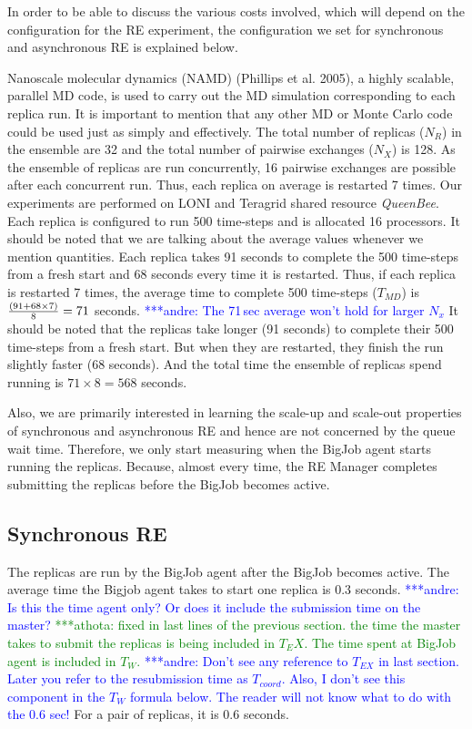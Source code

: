 \documentclass{rspublic}
\newcommand{\alnote}[1]{ {\textcolor{blue} { ***andre: #1 }}}
\newcommand{\athotanote}[1]{ {\textcolor{green} { ***athota: #1 }}}
\newcommand{\alnote}[1]{}
\newcommand{\athotanote}[1]{}
\begin{document}
In order to be able to discuss the various costs involved, 
which will depend on the configuration for the RE experiment, 
the configuration we set for synchronous and asynchronous RE is explained below.

Nanoscale molecular dynamics (NAMD)
(Phillips et al.  2005), a highly scalable, parallel MD code, is used
to carry out the MD simulation corresponding to each replica run. It
is important to mention that any other MD or Monte Carlo code could be
used just as simply and effectively. The total number of
replicas ($N_R$) in the ensemble are 32 and the total number of
pairwise exchanges ($N_X$) is 128. As the ensemble of replicas are run concurrently, 16 pairwise exchanges are possible after each concurrent run. Thus, each replica on average is restarted 7 times.
Our experiments are performed on
LONI and Teragrid shared resource \emph{QueenBee}. Each replica is
configured to run 500 time-steps and is allocated 16 processors. It
should be noted that we are talking about the average values whenever
we mention quantities. Each replica takes 91 seconds to complete the
500 time-steps from a fresh start and 68 seconds every time it is
restarted. Thus, if each replica is restarted 7 times, the average
time to complete 500 time-steps ($T_{MD}$) is ${(91+68\times 7) \over8} = 71$ seconds. 
\alnote{The 71\,sec average won't hold for larger $N_{x}$}
It should be noted that the replicas take longer (91 seconds) 
to complete their 500 time-steps from a fresh start. But when 
they are restarted, they finish the run slightly faster (68 seconds).   
And the total time the ensemble of replicas spend running is $71 \times 8 = 568$ seconds. 
  
Also, we are primarily
interested in learning the scale-up and scale-out properties of
synchronous and asynchronous RE and hence are not concerned by the
queue wait time. Therefore, we only start measuring when the BigJob agent starts running the replicas. Because, almost every time, the RE Manager completes submitting the replicas before the BigJob becomes active.

\subsection{Synchronous RE}
The replicas are run by the BigJob agent after the BigJob becomes active. The average 
time the Bigjob agent takes to start one replica is 0.3 seconds.  
\alnote{Is this the time agent only? Or does it include the submission time on the master?} 
\athotanote{fixed in last lines of the previous section. the time the master takes 
to submit the replicas is being included in $T_EX$. The time spent at BigJob agent 
is included in $T_W$. }  \alnote{Don't see any reference to $T_{EX}$ in last section. Later you
refer to the resubmission time as $T_{coord}$. Also, I don't see this component in the 
$T_W$ formula below. The reader will not know what to do with the 0.6 sec!}
For a pair of replicas, it is 0.6 seconds.
\end{document}
